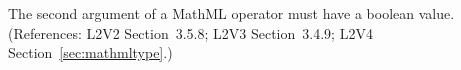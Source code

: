 The second argument of a MathML  operator must have
a boolean value.  (References: L2V2 Section~3.5.8; L2V3 Section~3.4.9;
L2V4 Section~\ref{sec:mathmltype}.)
